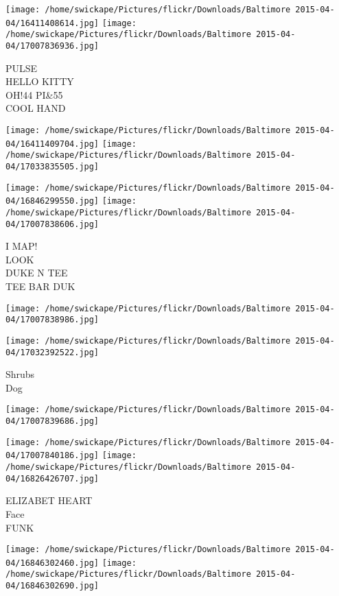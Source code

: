 \documentclass[10pt,letterpaper]{article}
\begin{document}
\texttt{[image: /home/swickape/Pictures/flickr/Downloads/Baltimore 2015-04-04/16411408614.jpg]}
\texttt{[image: /home/swickape/Pictures/flickr/Downloads/Baltimore 2015-04-04/17007836936.jpg]}

PULSE\\
HELLO KITTY\\
OH!44 PI\&55\\
COOL HAND\\
\pagebreak

\texttt{[image: /home/swickape/Pictures/flickr/Downloads/Baltimore 2015-04-04/16411409704.jpg]}
\texttt{[image: /home/swickape/Pictures/flickr/Downloads/Baltimore 2015-04-04/17033835505.jpg]}

\texttt{[image: /home/swickape/Pictures/flickr/Downloads/Baltimore 2015-04-04/16846299550.jpg]}
\texttt{[image: /home/swickape/Pictures/flickr/Downloads/Baltimore 2015-04-04/17007838606.jpg]}

I MAP!\\
LOOK\\
DUKE N TEE\\
TEE BAR DUK\\
\pagebreak

\texttt{[image: /home/swickape/Pictures/flickr/Downloads/Baltimore 2015-04-04/17007838986.jpg]}

\vspace{0.25in}
\texttt{[image: /home/swickape/Pictures/flickr/Downloads/Baltimore 2015-04-04/17032392522.jpg]}

Shrubs\\
Dog\\
\pagebreak

\texttt{[image: /home/swickape/Pictures/flickr/Downloads/Baltimore 2015-04-04/17007839686.jpg]}

\vspace{0.25in}
\texttt{[image: /home/swickape/Pictures/flickr/Downloads/Baltimore 2015-04-04/17007840186.jpg]}
\texttt{[image: /home/swickape/Pictures/flickr/Downloads/Baltimore 2015-04-04/16826426707.jpg]}

ELIZABET HEART\\
Face\\
FUNK\\
\pagebreak

\texttt{[image: /home/swickape/Pictures/flickr/Downloads/Baltimore 2015-04-04/16846302460.jpg]}
\texttt{[image: /home/swickape/Pictures/flickr/Downloads/Baltimore 2015-04-04/16846302690.jpg]}
\end{document}
